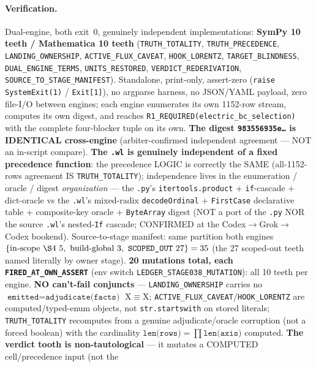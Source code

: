 \paragraph{Verification.}
Dual-engine, both exit~0, genuinely independent implementations:
\textbf{SymPy 10 teeth / Mathematica 10 teeth}
(\texttt{TRUTH\_TOTALITY}, \texttt{TRUTH\_PRECEDENCE}, \texttt{LANDING\_OWNERSHIP},
\texttt{ACTIVE\_FLUX\_CAVEAT}, \texttt{HOOK\_LORENTZ}, \texttt{TARGET\_BLINDNESS},
\texttt{DUAL\_ENGINE\_TERMS}, \texttt{UNITS\_RESTORED}, \texttt{VERDICT\_REDERIVATION},
\texttt{SOURCE\_TO\_STAGE\_MANIFEST}). Standalone, print-only, assert-zero
(\texttt{raise SystemExit(1)} / \texttt{Exit[1]}), no argparse harness, no
JSON/YAML payload, zero file-I/O between engines; each engine enumerates its own
1152-row stream, computes its own digest, and reaches
\texttt{R1\_REQUIRED(electric\_bc\_selection)} with the complete four-blocker
tuple on its own. \textbf{The digest \texttt{983556935e\ldots} is IDENTICAL
cross-engine} (arbiter-confirmed independent agreement --- NOT an in-script
compare). \textbf{The \texttt{.wl} is genuinely independent of a fixed
precedence function}: the precedence LOGIC is correctly the SAME (all-1152-rows
agreement IS \texttt{TRUTH\_TOTALITY}); independence lives in the enumeration /
oracle / digest \emph{organization} --- the \texttt{.py}'s
\texttt{itertools.product} + \texttt{if}-cascade + dict-oracle vs the
\texttt{.wl}'s mixed-radix \texttt{decodeOrdinal} + \texttt{FirstCase}
declarative table + composite-key oracle + \texttt{ByteArray} digest (NOT a port
of the \texttt{.py} NOR the source \texttt{.wl}'s nested-\texttt{If} cascade;
CONFIRMED at the Codex\(\to\)Grok\(\to\)Codex bookend). Source-to-stage manifest:
same partition both engines \(\{\text{in-scope \S4 }5,\ \text{build-global }3,\
\texttt{SCOPED\_OUT}\ 27\}=35\) (the 27 scoped-out teeth named literally by owner
stage). \textbf{20 mutations total, each \texttt{FIRED\_AT\_OWN\_ASSERT}} (env
switch \texttt{LEDGER\_STAGE038\_MUTATION}): all 10 teeth per engine. \textbf{NO
can't-fail conjuncts} --- \texttt{LANDING\_OWNERSHIP} carries no
\(\texttt{emitted}=\texttt{adjudicate(facts)}\) X\(\equiv\)X;
\texttt{ACTIVE\_FLUX\_CAVEAT}/\texttt{HOOK\_LORENTZ} are computed/typed-enum
objects, not \texttt{str.startswith} on stored literals;
\texttt{TRUTH\_TOTALITY} recomputes from a genuine adjudicate/oracle corruption
(not a forced boolean) with the cardinality
\(\texttt{len(rows)}=\prod\texttt{len(axis)}\) computed. \textbf{The verdict tooth
is non-tautological} --- it mutates a COMPUTED cell/precedence input (not the
